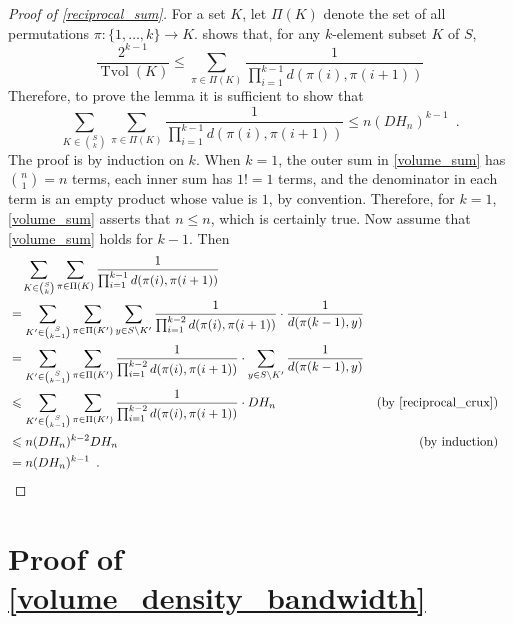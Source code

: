 \documentclass{patmorin}
\renewcommand{\le}{\leqslant}
\DeclareMathOperator{\tvol}{Tvol}
\begin{document}
\begin{proof}[Proof of \cref{reciprocal_sum}]
  For a set $K$, let $\Pi(K)$ denote the set of all permutations $\pi:\{1,\ldots,k\}\to K$.
  \citet[Lemma~17]{feige:approximating} shows that, for any $k$-element subset $K$ of $S$,
  \[
    \frac{2^{k-1}}{\tvol(K)} \le \sum_{\pi\in\Pi(K)}\frac{1}{\prod_{i=1}^{k-1}d(\pi(i),\pi(i+1))}
  \]
  Therefore, to prove the lemma it is sufficient to show that
  \begin{equation}
    \sum_{K\in\binom{S}{k}}\sum_{\pi\in\Pi(K)}\frac{1}{\prod_{i=1}^{k-1}d(\pi(i),\pi(i+1))} \le n(DH_n)^{k-1} \enspace .
    \label{volume_sum}
  \end{equation}
  The proof is by induction on $k$.  When $k=1$, the outer sum in \cref{volume_sum} has $\binom{n}{1}=n$ terms, each inner sum has $1!=1$ terms, and the denominator in each term is an empty product whose value is $1$, by convention.  Therefore, for $k=1$, \cref{volume_sum} asserts that $n \le n$, which is certainly true.  Now assume that \cref{volume_sum} holds for $k-1$.  Then
  \begin{align*}
    & \quad \sum_{K\in\binom{S}{k}}\sum_{\pi\in\Pi(K)}\frac{1}{\prod_{i=1}^{k-1}d(\pi(i),\pi(i+1))} \\
    & = \sum_{K'\in\binom{S}{k-1}}\sum_{\pi\in\Pi(K')}\sum_{y\in S\setminus K'}\frac{1}{\prod_{i=1}^{k-2}d(\pi(i),\pi(i+1))}\cdot\frac{1}{d(\pi(k-1),y)} \\
    & = \sum_{K'\in\binom{S}{k-1}}\sum_{\pi\in\Pi(K')}\frac{1}{\prod_{i=1}^{k-2}d(\pi(i),\pi(i+1))}\cdot\sum_{y\in S\setminus K'}\frac{1}{d(\pi(k-1),y)} \\
    & \le \sum_{K'\in\binom{S}{k-1}}\sum_{\pi\in\Pi(K')}\frac{1}{\prod_{i=1}^{k-2}d(\pi(i),\pi(i+1))}\cdot DH_n & \text{(by \cref{reciprocal_crux})}\\
    & \le n(DH_n)^{k-2}DH_n & \text{(by induction)}\\
    & = n(DH_n)^{k-1} \enspace . & & \qedhere
  \end{align*}
\end{proof}

\section{Proof of \cref{volume_density_bandwidth}}
\label{volume_density_bandwidth_section}

\volumedensitybandwidth*
\end{document}
